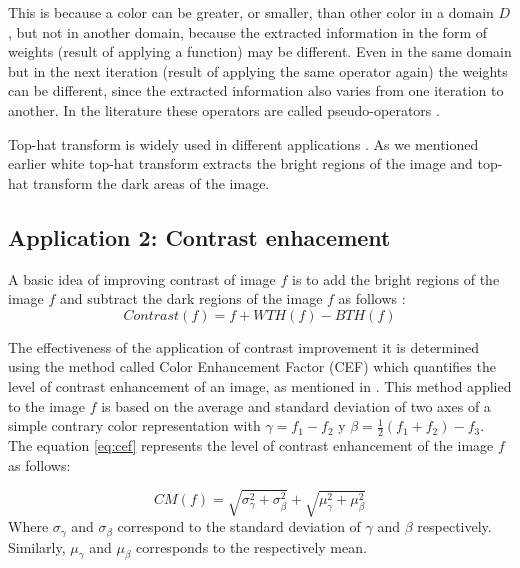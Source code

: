 This is because a color can be greater, or smaller, than other color in a domain $D$, but not in another domain, because the extracted information in the form of weights (result of applying a function) may be different. Even in the same domain but in the next iteration (result of applying the same operator again) the weights can be different, since the extracted information also varies from one iteration to another. In the literature these operators are called pseudo-operators \cite{hanbury2001morphological,aptoula2007pseudo,aptoula2008alpha,angulo2010pseudo,chen2002pseudo}. 

Top-hat transform is widely used in different applications \cite{soille2013morphological,mukhopadhyay2000multiscale,soille1997note,bai2010analysis,bai2010infrared,bai2010analysis1}. As we mentioned earlier white top-hat transform extracts the bright  regions of the image and  top-hat transform the dark areas of the image.

\subsection{Application 2: Contrast enhacement}
 A basic idea of improving contrast of image $f$ is to add the bright regions of the image $f$  and subtract the dark regions of the image $f$  as follows \cite{soille2013morphological}:
\begin{equation}
\label{contraste}
Contrast(f) = f + WTH(f) - BTH(f) 
\end{equation}


The effectiveness of the application of contrast improvement it is determined using the method called Color Enhancement Factor (CEF) which quantifies the level of contrast enhancement of an image, as mentioned in \cite{susstrunk2003color}. This method applied to the image $f$ is based on the average and standard deviation of two axes of a simple contrary color representation with $\gamma = f_1 - f_2$ y $\beta = \frac{1}{2}(f_1 + f_2) - f_3$.
The equation \ref{eq:cef} represents the level of contrast enhancement of the image $f$ as follows:

\begin{equation} %
CM(f)=\sqrt{\sigma_{\gamma}^{2} + \sigma_{\beta}^{2}} + \sqrt{\mu_{\gamma}^{2} + \mu_{\beta}^{2}}
\label{eq:cef}
\end{equation} Where $\sigma_{\gamma}$ and $\sigma_{\beta}$ correspond to the standard deviation of $\gamma$ and $\beta$ respectively. Similarly, $\mu_{\gamma}$ and $\mu_{\beta}$ corresponds to the respectively mean.

